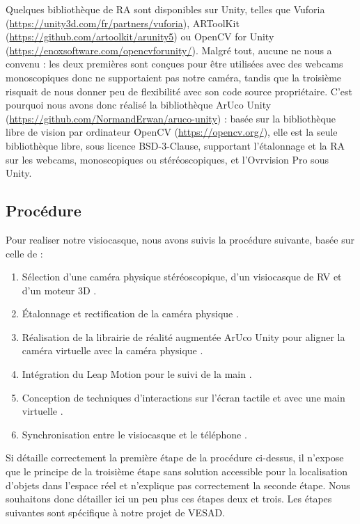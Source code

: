 Quelques bibliothèque de RA sont disponibles sur Unity, telles que Vuforia (\url{https://unity3d.com/fr/partners/vuforia}), ARToolKit (\url{https://github.com/artoolkit/arunity5}) ou OpenCV for Unity (\url{https://enoxsoftware.com/opencvforunity/}). Malgré tout, aucune ne nous a convenu : les deux premières sont conçues pour être utilisées avec des webcams monoscopiques donc ne supportaient pas notre caméra, tandis que la troisième risquait de nous donner peu de flexibilité avec son code source propriétaire. C'est pourquoi nous avons donc réalisé la bibliothèque ArUco Unity (\url{https://github.com/NormandErwan/aruco-unity}) : basée sur la bibliothèque libre de vision par ordinateur OpenCV (\url{https://opencv.org/}), elle est la seule bibliothèque libre, sous licence BSD-3-Clause, supportant l'étalonnage et la RA sur les webcams, monoscopiques ou stéréoscopiques, et l'Ovrvision Pro sous Unity.


\subsection{Procédure}
Pour realiser notre visiocasque, nous avons suivis la procédure suivante, basée sur celle de \cite{Steptoe2013} :
\begin{enumerate}
  \item Sélection d'une caméra physique stéréoscopique, d'un visiocasque de RV et d'un moteur 3D .
  \item Étalonnage et rectification de la caméra physique .
  \item Réalisation de la librairie de réalité augmentée ArUco Unity pour aligner la caméra virtuelle avec la caméra physique .
  \item Intégration du Leap Motion pour le suivi de la main .
  \item Conception de techniques d'interactions sur l'écran tactile et avec une main virtuelle .
  \item Synchronisation entre le visiocasque et le téléphone .
\end{enumerate}

Si \cite{Steptoe2013} détaille correctement la première étape de la procédure ci-dessus, il n'expose que le principe de la troisième étape sans solution accessible pour la localisation d'objets dans l'espace réel et n'explique pas correctement la seconde étape. Nous souhaitons donc détailler ici un peu plus ces étapes deux et trois. Les étapes suivantes sont spécifique à notre projet de VESAD.


